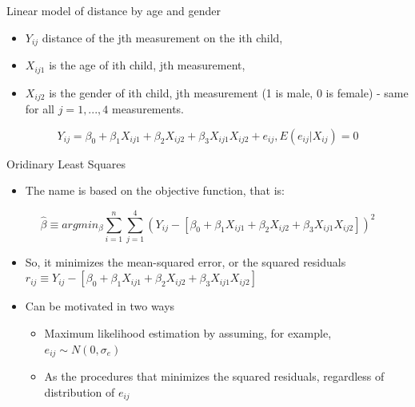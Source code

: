 \documentclass[ignorenonframetext,]{beamer}
\providecommand{\tightlist}{%
  \setlength{\itemsep}{0pt}\setlength{\parskip}{0pt}}
\begin{document}
\begin{frame}{Linear model of distance by age and gender}

\begin{itemize}
\tightlist
\item
  \(Y_{ij}\) distance of the jth measurement on the ith child,
\item
  \(X_{ij1}\) is the age of ith child, jth measurement,
\item
  \(X_{ij2}\) is the gender of ith child, jth measurement (1 is male, 0
  is female) - same for all \(j =1,...,4\) measurements.
\end{itemize}

\[ Y_{ij} = \beta_0 +\beta_1 X_{ij1}+\beta_2 X_{ij2} + \beta_3 X_{ij1}X_{ij2}+e_{ij}, E(e_{ij}|X_{ij})=0 \]

\end{frame}

\begin{frame}{Oridinary Least Squares}

\begin{itemize}
\tightlist
\item
  The name is based on the objective function, that is:
\end{itemize}

\[ \hat{\beta} \equiv argmin_{\beta} \sum_{i=1}^n \sum_{j=1}^4(Y_{ij}-[\beta_0 +\beta_1 X_{ij1}+\beta_2 X_{ij2} + \beta_3 X_{ij1}X_{ij2}]) ^2 \]

\begin{itemize}
\item
  So, it minimizes the mean-squared error, or the squared residuals
  \(r_{ij} \equiv Y_{ij}-[\beta_0 +\beta_1 X_{ij1}+\beta_2 X_{ij2} + \beta_3 X_{ij1}X_{ij2}]\)
\item
  Can be motivated in two ways

  \begin{itemize}
  \tightlist
  \item
    Maximum likelihood estimation by assuming, for example,
    \(e_{ij} \sim N(0,\sigma_e)\)
  \item
    As the procedures that minimizes the squared residuals, regardless
    of distribution of \(e_{ij}\)
  \end{itemize}
\end{itemize}

\end{frame}
\end{document}
